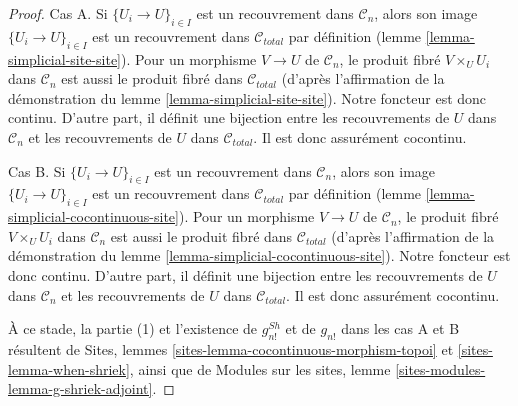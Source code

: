 \begin{proof}
Cas A. Si $\{U_i \to U\}_{i \in I}$ est un recouvrement dans $\mathcal{C}_n$,
alors son image $\{U_i \to U\}_{i \in I}$ est un recouvrement dans $\mathcal{C}_{total}$
par définition (lemme \ref{lemma-simplicial-site-site}). Pour un morphisme
$V \to U$ de $\mathcal{C}_n$, le produit fibré
$V \times_U U_i$ dans $\mathcal{C}_n$ est aussi
le produit fibré dans $\mathcal{C}_{total}$ (d'après l'affirmation de la
démonstration du lemme \ref{lemma-simplicial-site-site}).
Notre foncteur est donc continu. D'autre part, il
définit une bijection entre les recouvrements de $U$ dans $\mathcal{C}_n$
et les recouvrements de $U$ dans $\mathcal{C}_{total}$. Il est donc
assurément cocontinu.

\medskip\noindent
Cas B. Si $\{U_i \to U\}_{i \in I}$ est un recouvrement dans $\mathcal{C}_n$,
alors son image $\{U_i \to U\}_{i \in I}$ est un recouvrement dans $\mathcal{C}_{total}$
par définition (lemme \ref{lemma-simplicial-cocontinuous-site}). Pour un morphisme
$V \to U$ de $\mathcal{C}_n$, le produit fibré
$V \times_U U_i$ dans $\mathcal{C}_n$ est aussi
le produit fibré dans $\mathcal{C}_{total}$ (d'après l'affirmation de la
démonstration du lemme \ref{lemma-simplicial-cocontinuous-site}).
Notre foncteur est donc continu. D'autre part, il
définit une bijection entre les recouvrements de $U$ dans $\mathcal{C}_n$
et les recouvrements de $U$ dans $\mathcal{C}_{total}$. Il est donc
assurément cocontinu.

\medskip\noindent
À ce stade, la partie (1) et l'existence de $g^{Sh}_{n!}$ et de $g_{n!}$
dans les cas A et B résultent de
Sites, lemmes \ref{sites-lemma-cocontinuous-morphism-topoi} et
\ref{sites-lemma-when-shriek},
ainsi que de
Modules sur les sites, lemme \ref{sites-modules-lemma-g-shriek-adjoint}.


\end{proof}
